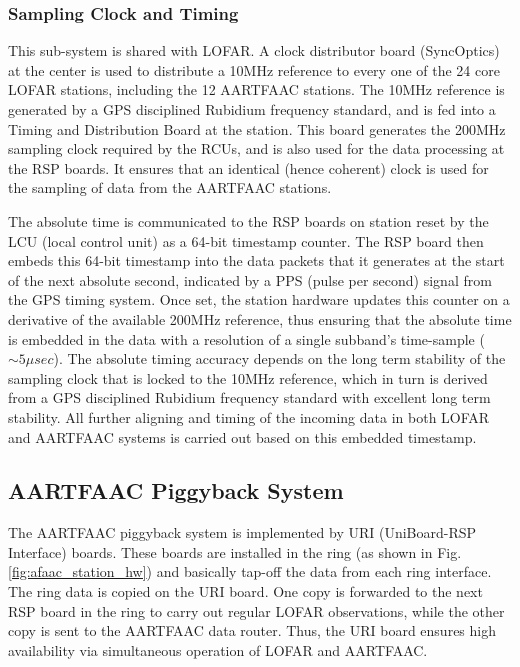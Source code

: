 \documentclass{ws-jai}
\begin{document}
\subsubsection  {Sampling Clock and  Timing}
 This sub-system is  shared with
LOFAR.  A  clock  distributor  board  (SyncOptics) at  the  center  is  used  to
distribute  a 10MHz  reference  to every  one  of the  24  core LOFAR  stations,
including the 12  AARTFAAC stations.  The 10MHz reference is  generated by a GPS
disciplined  Rubidium  frequency  standard,  and   is  fed  into  a  Timing  and
Distribution Board  at the  station.  This board  generates the  200MHz sampling
clock required by the RCUs, and is also  used for the data processing at the RSP
boards. It  ensures that  an identical  (hence coherent) clock  is used  for the
sampling of data from the AARTFAAC stations.

The absolute time is communicated to the  RSP boards on station reset by the LCU
(local control  unit) as a 64-bit  timestamp counter. The RSP  board then embeds
this 64-bit timestamp  into the data packets  that it generates at  the start of
the next absolute second, indicated by a  PPS (pulse per second) signal from the
GPS timing  system.  Once set,  the station hardware  updates this counter  on a
derivative of  the available 200MHz  reference, thus ensuring that  the absolute
time  is  embedded  in  the  data  with a  resolution  of  a  single  subband's
time-sample ($\sim5\mu sec$).  The absolute  timing accuracy depends on the long
term stability  of the  sampling clock  that is locked  to the  10MHz reference,
which in turn is derived from a GPS disciplined Rubidium frequency standard with
excellent long term stability.  All further  aligning and timing of the incoming
data in both  LOFAR and AARTFAAC systems  is carried out based  on this embedded
timestamp.

\subsection {AARTFAAC Piggyback System}
The AARTFAAC  piggyback system  is implemented  by URI  (UniBoard-RSP Interface)
boards.   These   boards   are   installed    in   the   ring   (as   shown   in
Fig. \ref{fig:afaac_station_hw}) and  basically tap-off the data  from each ring
interface. The ring  data is copied on  the URI board. One copy  is forwarded to
the next RSP  board in the ring  to carry out regular  LOFAR observations, while
the other copy is sent to the  AARTFAAC data router. Thus, the URI board ensures
high availability via simultaneous operation of LOFAR and AARTFAAC.
\end{document}
